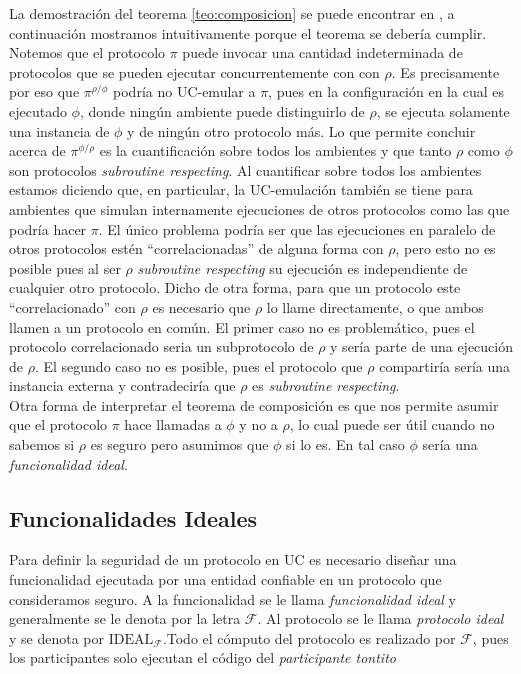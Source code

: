 La demostración del teorema \ref{teo:composicion} se puede encontrar en \cite{UC:completo}, a continuación
mostramos intuitivamente porque el teorema se debería cumplir.\\
Notemos que el protocolo $\pi$ puede invocar una cantidad indeterminada de protocolos
que se pueden ejecutar concurrentemente
con con $\rho$. Es precisamente por eso que $\pi^{\rho/\phi}$ podría no UC-emular a $\pi$, pues en la configuración
en la cual es ejecutado $\phi$, donde ningún ambiente puede distinguirlo de $\rho$, se ejecuta solamente una
instancia de $\phi$ y de ningún otro protocolo más. Lo que permite concluir acerca de $\pi^{\phi/\rho}$ es la
cuantificación sobre todos los ambientes y que tanto $\rho$ como $\phi$ son protocolos \textit{subroutine
respecting}. Al cuantificar sobre todos los ambientes estamos diciendo que, en particular, la UC-emulación
también se tiene para ambientes que simulan internamente ejecuciones de otros protocolos como las que podría
hacer $\pi$. El único problema podría ser que las ejecuciones en paralelo de otros protocolos estén
``correlacionadas'' de alguna forma con $\rho$, pero esto no es posible pues al ser $\rho$ \textit{subroutine respecting}
su ejecución es independiente de cualquier otro protocolo. Dicho de otra forma, para que un protocolo
este ``correlacionado'' con $\rho$ es necesario que $\rho$ lo llame directamente, o que ambos llamen a un protocolo
en común. El primer caso no es problemático, pues el protocolo correlacionado seria un subprotocolo de $\rho$
y sería parte de una ejecución de $\rho$. El segundo caso no es posible, pues el protocolo que $\rho$ compartiría
sería una instancia externa y contradeciría que $\rho$ es \textit{subroutine respecting}.\\

Otra forma de interpretar el teorema de composición es que nos permite asumir que el protocolo $\pi$ hace llamadas
a $\phi$ y no a $\rho$, lo cual puede ser útil cuando no sabemos si $\rho$ es seguro pero asumimos que $\phi$
si lo es. En tal caso $\phi$ sería una \textit{funcionalidad ideal}.

\subsection{Funcionalidades Ideales}
Para definir la seguridad de un protocolo en UC es necesario diseñar una funcionalidad ejecutada por una entidad
confiable en un protocolo que consideramos seguro. A la funcionalidad se le llama \textit{funcionalidad ideal} y
generalmente se le denota por la letra $\mathcal{F}$. Al protocolo se le llama \textit{protocolo ideal} y se
denota por $\mathrm{IDEAL}_\mathcal{F}$.Todo el cómputo del protocolo es realizado por $\mathcal{F}$, pues
los participantes solo ejecutan el código del \textit{participante tontito}

